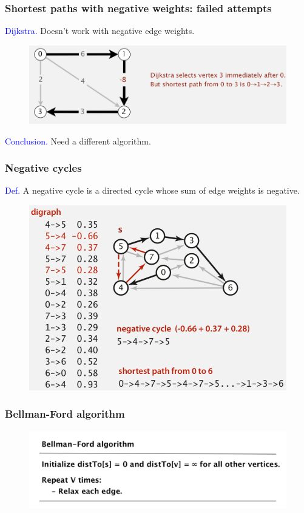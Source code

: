 \documentclass[11pt]{beamer}
\begin{document}
\begin{frame}
	\frametitle	{Shortest paths with negative weights: failed attempts}  
    \textcolor{blue}{Dijkstra.} Doesn’t work with negative edge weights.
    \begin{figure}
    	\centering
    	\includegraphics[width=1\linewidth]{"Screenshot 2020-12-06 at 8.24.22 PM"}
    	\label{fig:screenshot-2020-12-06-at-8}
    \end{figure}
    \textcolor{blue}{Conclusion.} Need a different algorithm.
\end{frame}

\begin{frame}
	\frametitle	{Negative cycles}  
   \textcolor{blue}{Def.} A \alert{negative cycle} is a directed cycle whose sum of edge weights is negative.
   \begin{figure}
   	\centering
   	\includegraphics[width=0.8\linewidth]{"Screenshot 2020-12-06 at 8.44.01 PM"}
   	\label{fig:screenshot-2020-12-06-at-8}
   \end{figure}  
\end{frame}

\begin{frame}
	\frametitle	{Bellman-Ford algorithm}  
	\begin{figure}
		\centering
		\includegraphics[width=1\linewidth]{"Screenshot 2020-12-06 at 8.52.34 PM"}
		\label{fig:screenshot-2020-12-06-at-8}
	\end{figure}
\end{frame}
\end{document}
